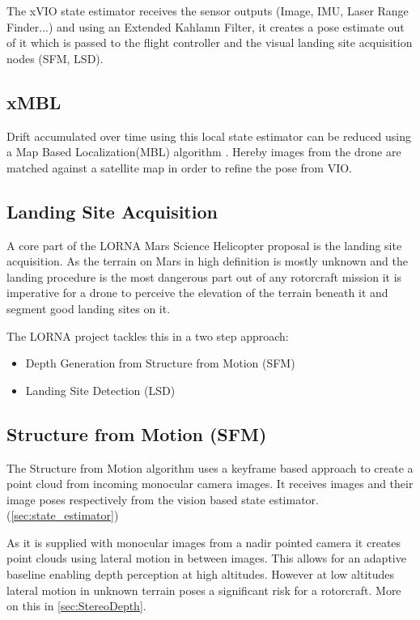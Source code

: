 The xVIO state estimator receives the sensor outputs (Image, IMU, Laser Range
Finder...) and using an Extended Kahlamn Filter, it creates a pose estimate out of it which is passed to the flight controller and the visual landing site acquisition nodes (SFM, LSD).

\subsection{xMBL}

Drift accumulated over time using this local state estimator can be reduced using a Map Based Localization(MBL) algorithm \citep{XMBL}. Hereby images from the drone are matched against a satellite map in order to refine the pose from VIO.


\subsection{Landing Site Acquisition }

A core part of the LORNA Mars Science Helicopter proposal is the landing site acquisition. As the terrain on Mars in high definition is mostly unknown and the landing procedure is the most dangerous part out of any rotorcraft mission it is imperative for a drone to perceive the elevation of the terrain beneath it and segment good landing sites on it.

The LORNA project tackles this in a two step approach:

\begin{itemize}
    \item Depth Generation from Structure from Motion (SFM) \citep{SFM}
    \item Landing Site Detection (LSD) \citep{LSD1, LSD2}
\end{itemize}

\subsection{Structure from Motion (SFM)}\label{subsec:related_work:SFM}

The Structure from Motion algorithm \citep{SFM} uses a keyframe based approach to create a point cloud from incoming monocular camera images. It receives images and their image poses respectively from the vision based state estimator. (\ref{sec:state_estimator})

As it is supplied with monocular images from a nadir pointed camera it creates point clouds using lateral motion in between images. This allows for an adaptive baseline enabling depth perception at high altitudes. However at low altitudes lateral motion in unknown terrain poses a significant risk for a rotorcraft. More on this in \cref{sec:StereoDepth}.

